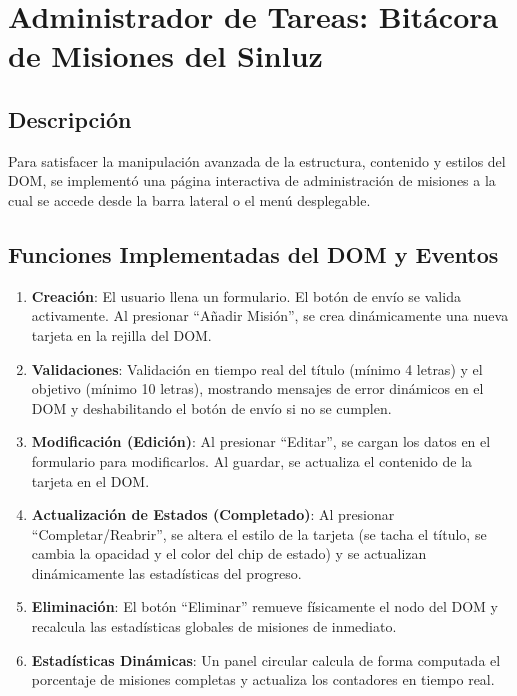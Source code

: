 \documentclass[11pt,a4paper]{article}
\begin{document}
\section{Administrador de Tareas: Bitácora de Misiones del Sinluz}

\subsection{Descripción}
Para satisfacer la manipulación avanzada de la estructura, contenido y estilos del DOM, se implementó una página interactiva de administración de misiones a la cual se accede desde la barra lateral o el menú desplegable.

\subsection{Funciones Implementadas del DOM y Eventos}
\begin{enumerate}
    \item \textbf{Creación}: El usuario llena un formulario. El botón de envío se valida activamente. Al presionar ``Añadir Misión'', se crea dinámicamente una nueva tarjeta en la rejilla del DOM.
    \item \textbf{Validaciones}: Validación en tiempo real del título (mínimo 4 letras) y el objetivo (mínimo 10 letras), mostrando mensajes de error dinámicos en el DOM y deshabilitando el botón de envío si no se cumplen.
    \item \textbf{Modificación (Edición)}: Al presionar ``Editar'', se cargan los datos en el formulario para modificarlos. Al guardar, se actualiza el contenido de la tarjeta en el DOM.
    \item \textbf{Actualización de Estados (Completado)}: Al presionar ``Completar/Reabrir'', se altera el estilo de la tarjeta (se tacha el título, se cambia la opacidad y el color del chip de estado) y se actualizan dinámicamente las estadísticas del progreso.
    \item \textbf{Eliminación}: El botón ``Eliminar'' remueve físicamente el nodo del DOM y recalcula las estadísticas globales de misiones de inmediato.
    \item \textbf{Estadísticas Dinámicas}: Un panel circular calcula de forma computada el porcentaje de misiones completas y actualiza los contadores en tiempo real.
\end{enumerate}
\end{document}
